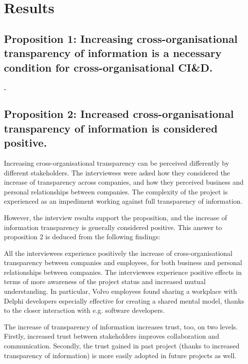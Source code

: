 \section{Results}\label{sec:results}


\subsection{Proposition 1: Increasing cross-organisational transparency of information is a necessary condition for cross-organisational CI\&D.}

{\bf .}

\subsection{Proposition 2: Increased cross-organisational transparency of information is considered positive.}

Increasing cross-organisational transparency can be perceived differently by different stakeholders. The interviewees were asked how they considered the increase of transparency across companies, and how they perceived business and personal relationships between companies. The complexity of the project is experienced as an impediment working against full transparency of information.

However, the interview results support the proposition, and the increase of information transparency is generally considered positive. This answer to proposition 2 is deduced from the following findings:

 All the interviewees experience positively the increase of cross-organisational transparency between companies and employees, for both business and personal relationships between companies. The interviewees experience positive effects in terms of more awareness of the project status and increased mutual understanding. In particular, Volvo employees found sharing a workplace with Delphi developers especially effective for creating a shared mental model, thanks to the closer interaction with e.g. software developers.

 The increase of transparency of information increases trust, too, on two levels. Firstly, increased trust between stakeholders improves collaboration and communication. Secondly, the trust gained in past project (thanks to increased transparency of information) is more easily adopted in future projects as well. 

